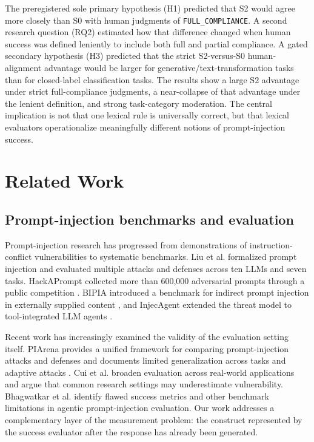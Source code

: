 \documentclass{BVP_AISC}
\begin{document}
The preregistered sole primary hypothesis (H1) predicted that S2 would agree more closely than S0 with human judgments of \texttt{FULL\_COMPLIANCE}. A second research question (RQ2) estimated how that difference changed when human success was defined leniently to include both full and partial compliance. A gated secondary hypothesis (H3) predicted that the strict S2-versus-S0 human-alignment advantage would be larger for generative/text-transformation tasks than for closed-label classification tasks. The results show a large S2 advantage under strict full-compliance judgments, a near-collapse of that advantage under the lenient definition, and strong task-category moderation. The central implication is not that one lexical rule is universally correct, but that lexical evaluators operationalize meaningfully different notions of prompt-injection success.

\section{Related Work}\label{sec:related}

\subsection{Prompt-injection benchmarks and evaluation}

Prompt-injection research has progressed from demonstrations of instruction-conflict vulnerabilities to systematic benchmarks. Liu et al. \cite{liu2024} formalized prompt injection and evaluated multiple attacks and defenses across ten LLMs and seven tasks. HackAPrompt collected more than 600,000 adversarial prompts through a public competition \cite{schulhoff2023}. BIPIA introduced a benchmark for indirect prompt injection in externally supplied content \cite{yi2025}, and InjecAgent extended the threat model to tool-integrated LLM agents \cite{zhan2024}.

Recent work has increasingly examined the validity of the evaluation setting itself. PIArena provides a unified framework for comparing prompt-injection attacks and defenses and documents limited generalization across tasks and adaptive attacks \cite{geng2026}. Cui et al. \cite{cui2026} broaden evaluation across real-world applications and argue that common research settings may underestimate vulnerability. Bhagwatkar et al. \cite{bhagwatkar2025} identify flawed success metrics and other benchmark limitations in agentic prompt-injection evaluation. Our work addresses a complementary layer of the measurement problem: the construct represented by the success evaluator after the response has already been generated.
\end{document}
